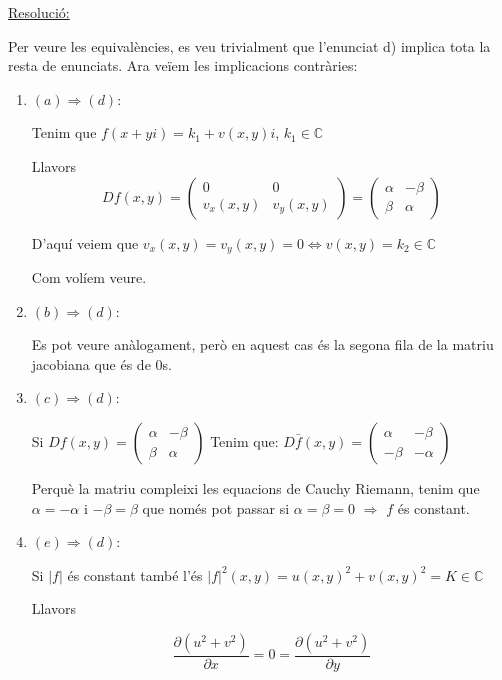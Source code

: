 \documentclass[10pt,a4paper]{article}
\begin{document}
\begin{enumerate}
\underline{Resolució:}

Per veure les equivalències, es veu trivialment que l'enunciat d) implica tota la resta de enunciats. Ara veïem les implicacions contràries:

\begin{enumerate}
\item $(a)\Rightarrow(d)$:

Tenim que $f(x+yi)=k_{1}+v(x,y)i$, $k_{1}\in\mathbb{C}$
	
Llavors $$Df(x,y)=
\left(\begin{matrix}
  0 & 0 \\
  v_{x}(x,y) & v_{y}(x,y)
\end{matrix}\right) = 
\left(\begin{matrix}
  \alpha & -\beta \\
  \beta & \alpha
\end{matrix}\right)$$

D'aquí veiem que $v_{x}(x,y)=v_{y}(x,y)=0 \Leftrightarrow v(x,y)=k_{2}\in\mathbb{C}$

Com volíem veure.

\item $(b)\Rightarrow(d)$:

Es pot veure anàlogament, però en aquest cas és la segona fila de la matriu jacobiana que és de 0s.

\item $(c)\Rightarrow(d)$:

Si $Df(x,y)=
\left(\begin{matrix}
  \alpha & -\beta \\
  \beta & \alpha
\end{matrix}\right)$
Tenim que:
$D\bar{f}(x,y)=
\left(\begin{matrix}
  \alpha & -\beta \\
  -\beta & -\alpha
\end{matrix}\right)$

Perquè la matriu compleixi les equacions de Cauchy Riemann, tenim que $\alpha=-\alpha$ i $-\beta=\beta$ que només pot passar si $\alpha=\beta=0$ $\Rightarrow$ $f$ és constant.

\item $(e)\Rightarrow(d)$:

Si $|f|$ és constant també l'és $|f|^{2}(x,y) = u(x,y)^2 + v(x,y)^2 = K \in \mathbb{C}$

Llavors 

$$\frac{\partial (u^{2} + v^{2}) }{\partial x} = 0 = \dfrac{\partial (u^{2} + v^{2}) }{\partial y}$$


\end{enumerate}
\end{enumerate}
\end{document}
